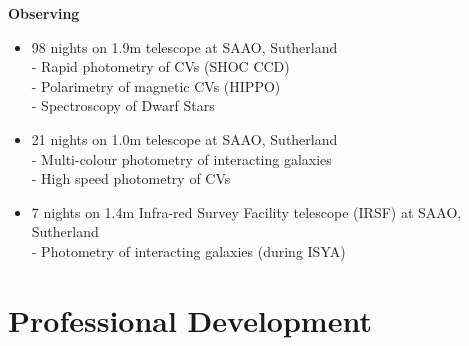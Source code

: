 \documentclass{article}
\begin{document}
\vspace{0.2cm}
\large\textbf{Observing}
\normalsize
\vspace{0.2cm}

\begin{itemize}
 \item 98 nights on 1.9m telescope at SAAO, Sutherland\\
  \hspace*{0.4cm} - Rapid photometry of CVs (SHOC CCD)\\ %
  \hspace*{0.4cm} - Polarimetry of magnetic CVs (HIPPO)\\%
  \hspace*{0.4cm} - Spectroscopy of Dwarf Stars %
 
 \item 21 nights on 1.0m telescope at SAAO, Sutherland \\
  \hspace*{0.4cm} -  Multi-colour photometry of interacting galaxies \\
  \hspace*{0.4cm} -  High speed photometry of CVs
 
 \item 7 nights on 1.4m Infra-red Survey Facility telescope (IRSF) at SAAO, Sutherland \\
 \hspace*{0.4cm} - Photometry of interacting galaxies (during ISYA)
\end{itemize}  
  
  


\section*{Professional Development}

\end{document}
